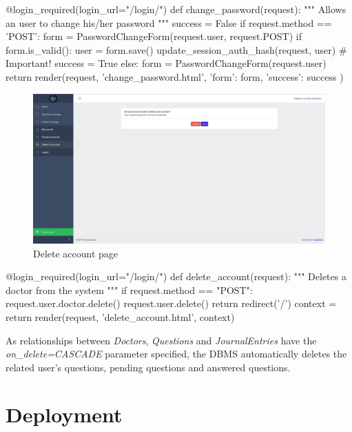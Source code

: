 \documentclass[12pt,english]{article}
\begin{document}
\begin{python}[caption={Method to change user's password}, captionpos=b]
@login_required(login_url="/login/")
def change_password(request):
    """
    Allows an user to change his/her password
    """
    success = False
    if request.method == 'POST':
        form = PasswordChangeForm(request.user, request.POST)
        if form.is_valid():
            user = form.save()
            update_session_auth_hash(request, user)  # Important!
            success = True
    else:
        form = PasswordChangeForm(request.user)
    return render(request, 'change_password.html', {
        'form': form,
        'success': success
    })
\end{python}


\begin{figure}[H]
    \centering
    \includegraphics[width=\textwidth]{delete_account.png}
    \caption{Delete account page}
\end{figure}


\begin{python}[caption={Method to delete an account}, captionpos=b]
@login_required(login_url="/login/")
def delete_account(request):
    """
    Deletes a doctor from the system
    """
    if request.method == "POST":
        request.user.doctor.delete()
        request.user.delete()
        return redirect('/')
    context = {}
    return render(request, 'delete_account.html', context)
\end{python}


As relationships between \emph{Doctors}, \emph{Questions} and \emph{JournalEntries} have the\\\emph{on\_delete=CASCADE} parameter specified, the DBMS automatically deletes the related user's questions, pending questions and answered questions.


\section{Deployment}
\label{sec:deployment}
\end{document}
